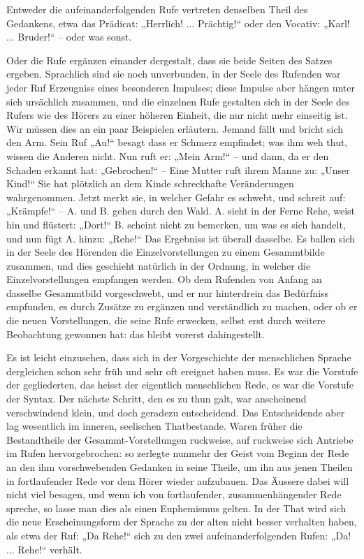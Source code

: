 Entweder die aufeinanderfolgenden Rufe vertreten denselben Theil des Gedankens, etwa das Prädicat: „Herrlich! ... Prächtig!“ oder den Vocativ: „Karl! ... Bruder!“ – oder was sonst.

Oder die Rufe ergänzen einander dergestalt, dass sie beide Seiten des Satzes ergeben. Sprachlich sind sie noch unverbunden, in der Seele des Rufenden war jeder Ruf Erzeugniss eines besonderen Impulses; diese Impulse aber hängen unter sich ursächlich zusammen, und die einzelnen Rufe gestalten sich in der Seele des Rufers wie des Hörers zu einer höheren Einheit, die nur nicht mehr einseitig ist. Wir müssen dies an ein paar Beispielen erläutern. Jemand fällt und bricht sich den Arm. Sein Ruf „Au!“ besagt  dass er Schmerz empfindet; was ihm weh thut, wissen die Anderen nicht. Nun ruft er: „Mein Arm!“ – und dann, da er den Schaden erkannt hat: „Gebrochen!“ – Eine Mutter ruft ihrem Manne zu: „Unser Kind!“ Sie hat plötzlich an dem Kinde schreckhafte Veränderungen wahrgenommen. Jetzt merkt sie, in welcher Gefahr es schwebt, und schreit auf: „Krämpfe!“ – A. und B. gehen durch den Wald. A. sieht in der Ferne Rehe, weist hin und flüstert: „Dort!“ B. scheint nicht \label{sp.368} zu bemerken, um was es sich handelt, und nun fügt A. hinzu: „Rehe!“ Das Ergebniss ist überall dasselbe. Es ballen sich in der Seele des Hörenden die Einzelvorstellungen zu einem Gesammtbilde zusammen, und dies geschieht natürlich in der Ordnung, in welcher die Einzelvorstellungen empfangen werden. Ob dem Rufenden von Anfang an dasselbe Gesammtbild vorgeschwebt, und er nur hinterdrein das Bedürfniss empfunden, es durch Zusätze zu ergänzen und verständlich zu machen, oder ob er die neuen Vorstellungen, die seine Rufe erwecken, selbst erst durch weitere Beobachtung gewonnen hat: das bleibt vorerst dahingestellt.

Es ist leicht einzusehen, dass sich in der Vorgeschichte der menschlichen Sprache dergleichen schon sehr früh und sehr oft ereignet haben muss. Es war die Vorstufe der gegliederten, das heisst der eigentlich menschlichen Rede, es war die Vorstufe der Syntax. Der nächste Schritt, \label{fp.352} den es zu thun galt, war anscheinend verschwindend klein, und doch geradezu entscheidend. Das Entscheidende aber lag wesentlich im inneren, seelischen Thatbestande. Waren früher die Bestandtheile der Gesammt-Vorstellungen ruckweise, auf ruckweise sich  Antriebe im Rufen hervorgebrochen: so zerlegte nunmehr der Geist vom Beginn der Rede an den ihm vorschwebenden Gedanken in seine Theile, um ihn aus jenen Theilen in fortlaufender Rede vor dem Hörer wieder aufzubauen. Das Äussere dabei will nicht viel besagen, und wenn ich von fortlaufender, zusammenhängender Rede spreche, so lasse man dies als einen Euphemismus gelten. In der That wird sich die neue Erscheinungsform der Sprache zu der alten nicht besser verhalten haben, als etwa der Ruf: „Da Rehe!“ sich zu den zwei aufeinanderfolgenden Rufen: „Da! ... Rehe!“ verhält.

